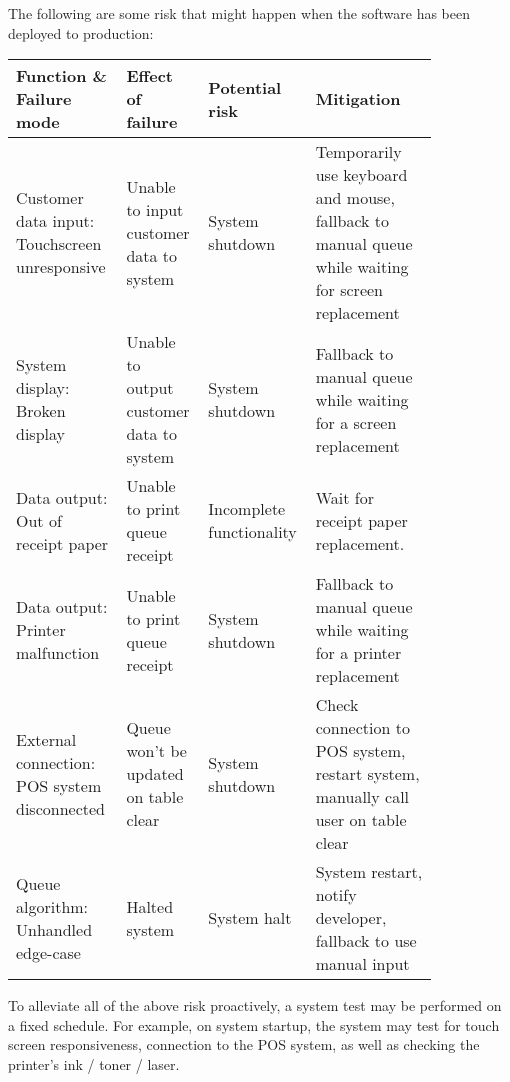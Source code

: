 \documentclass[
  11pt, %
]{assignment}
\begin{document}
The following are some risk that might happen when the software has been deployed to production:

\medskip

\footnotesize
\begin{tabular}{p{0.25\linewidth} p{0.15\linewidth} p{0.16\linewidth} p{0.28\linewidth}}
  Function \& Failure mode                      & Effect of failure                        & Potential risk           & Mitigation                                                                                        \\
  \toprule
  Customer data input: Touchscreen unresponsive & Unable to input customer data to system  & System shutdown          & Temporarily use keyboard and mouse, fallback to manual queue while waiting for screen replacement \\
  System display: Broken display                & Unable to output customer data to system & System shutdown          & Fallback to manual queue while waiting for a screen replacement                                   \\
  Data output: Out of receipt paper             & Unable to print queue receipt            & Incomplete functionality & Wait for receipt paper replacement.                                                               \\
  Data output: Printer malfunction              & Unable to print queue receipt            & System shutdown          & Fallback to manual queue while waiting for a printer replacement                                  \\
  External connection: POS system disconnected  & Queue won't be updated on table clear    & System shutdown          & Check connection to POS system, restart system, manually call user on table clear                 \\
  Queue algorithm: Unhandled edge-case          & Halted system                            & System halt              & System restart, notify developer, fallback to use manual input                                    \\
  \bottomrule
\end{tabular}

\normalsize
\medskip

To alleviate all of the above risk proactively, a system test may be performed on a fixed schedule. For example, on system startup, the system may test for touch screen responsiveness, connection to the POS system, as well as checking the printer's ink / toner / laser.
\end{document}
